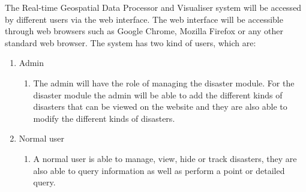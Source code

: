The Real-time Geospatial Data Processor and Visualiser system will be accessed by different users via the web interface. The web interface will be accessible through web browsers such as Google Chrome, Mozilla Firefox or any other standard web browser.\newline  
The system has two kind of users, which are:
\begin{enumerate}	
	\item Admin
		\begin{enumerate}
			\item The admin will have the role of managing the disaster module. For the disaster module the admin will be able to add the different kinds of disasters that can be viewed on the website and they are also able to modify the different kinds of disasters.
		\end{enumerate}
	\item Normal user
		\begin{enumerate}
			\item A normal user is able to manage, view, hide or track disasters, they are also able to query information as well as perform a point or detailed query.
		\end{enumerate}
\end{enumerate}